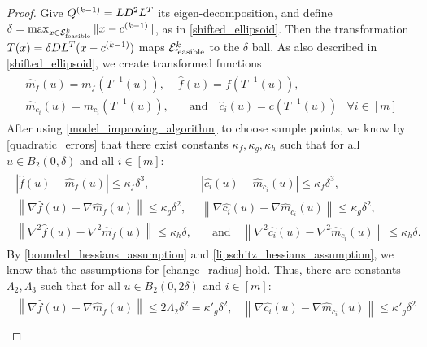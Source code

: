 \begin{proof}
Give ${Q^{(k-1)}} = LD^2L^T$ its eigen-decomposition, and define $\delta = \max_{x \in {\mathcal E^k_{\textrm{feasible}}}} \|x - {c^{(k-1)}}\|$, as in \cref{shifted_ellipsoid}.
Then the transformation $T(x) = \delta D L^T(x - {c^{(k-1)}})$ maps ${\mathcal E^k_{\textrm{feasible}}}$ to the $\delta$ ball.
As also described in \cref{shifted_ellipsoid}, we create transformed functions
\begin{align*}
\begin{array}{ccc}
\hat {m}_f(u) = m_f(T^{-1}(u)),&  \hat f (u) = f(T^{-1}(u)), &\\
\hat {m}_{c_i}(u) = m_{c_i}(T^{-1}(u)), &  \quad \textrm{and} \quad \hat c_i (u) = c(T^{-1}(u))& \forall i \in [m]
\end{array}
\end{align*}
After using \cref{model_improving_algorithm} to choose sample points, we know by \cref{quadratic_errors} that
there exist constants $\kappa_f, \kappa_g, \kappa_h$ such that for all $u \in B_2(0, \delta)$ and all $i \in [m]$:
\begin{align*}
\begin{array}{cc}
\left| \hat {f}\left(u\right) -  \hat{m}_f\left(u\right) \right|\le \kappa_f \delta^3, &
\left| \hat {{c_i}}\left(u\right) -  \hat{m}_{c_i}\left(u\right) \right|\le \kappa_f \delta^3, \\
\left\|\nabla \hat {f}\left(u\right) - \nabla \hat{m}_f\left(u\right) \right\|\le \kappa_g \delta^2, &
\left\|\nabla \hat {{c_i}}\left(u\right) - \nabla \hat{m}_{c_i}\left(u\right) \right\|\le \kappa_g \delta^2, \\
\left\|\nabla^2 \hat {f}\left(u\right) - \nabla^2 \hat{m}_f\left(u\right) \right\|\le \kappa_h \delta, &
\quad \textrm{and} \quad \left\|\nabla^2 \hat {{c_i}}\left(u\right) - \nabla^2 \hat{m}_{c_i}\left(u\right) \right\|\le \kappa_h \delta.
\end{array}
\end{align*}
By \cref{bounded_hessians_assumption} and \cref{lipschitz_hessians_assumption}, we know that the assumptions for \cref{change_radius} hold.
Thus, there are constants $\Lambda_2, \Lambda_3$ such that for all $u \in B_2(0, 2\delta)$ and $i \in [m]$:
\begin{align*}
\begin{array}{cc}
\left\|\nabla \hat {f}\left(u\right) - \nabla \hat{m}_f\left(u\right) \right\|\le 2\Lambda_2 \delta^2 = {\kappa'}_g\delta^2, &
\left\|\nabla \hat {c_i}\left(u\right) - \nabla \hat{m}_{c_i}\left(u\right) \right\|\le {\kappa'}_g\delta^2 \\

\end{array}
\end{align*}
\end{proof}
